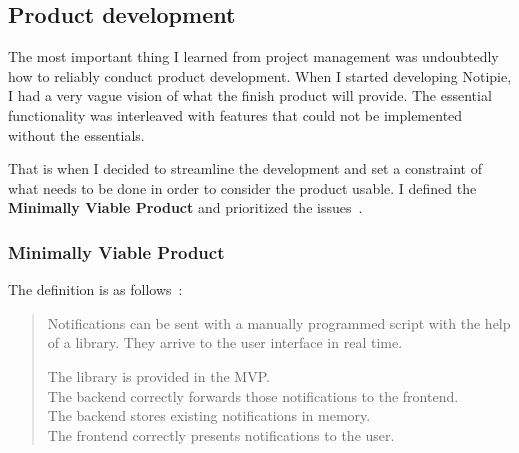 \subsection{Product development}\label{sec:product-development}

The most important thing I learned from project management was undoubtedly
how to reliably conduct product development.
When I started developing Notipie,
I had a very vague vision of what the finish product will provide.
The essential functionality was interleaved with features
that could not be implemented without the essentials.

That is when I decided to streamline the development
and set a constraint of what needs to be done
in order to consider the product usable.
I defined the \textbf{Minimally Viable Product}
and prioritized the issues~\cite{sewera_issues_2022}.

\subsubsection{Minimally Viable Product}\label{sec:minimally-viable-product}

The definition is as follows~\cite{sewera_mvp_2022}:

\begin{quote}
      Notifications can be sent with a manually programmed script
      with the help of a library.
      They arrive to the user interface in real time.

      The library is provided in the MVP.\\
      The backend correctly forwards those notifications to the frontend.\\
      The backend stores existing notifications in memory.\\
      The frontend correctly presents notifications to the user.
\end{quote}
